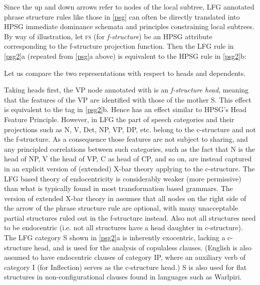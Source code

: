 \noindent
Since the up and down arrows refer to nodes of the local subtree, LFG annotated phrase structure rules like those in \ref{psg} can often be directly translated into HPSG immediate dominance schemata and principles constraining local subtrees.  
By way of illustration, let \textsc{fs} (for \textit{f-structure}) be an HPSG attribute corresponding to the f-structure projection function.  Then the LFG rule in \ref{psg2}a (repeated from \ref{psg}a above) is equivalent to the  HPSG rule in \ref{psg2}b:

\eal 
 \label{psg2}
\ex
{
}
               
\ex 
{
\phraserule{S[\textsc{fs} \fbox{1}]}{\rulenode{DP[\textsc{fs} \fbox{2}]}  \rulenode{VP[\textsc{fs}  \fbox{1}[\textsc{subj} \fbox{2}]}}}
\zl

\noindent
Let us compare the two representations with respect to heads and dependents.

Taking heads first, the VP node annotated with \updown is an \textit{f-structure head}, meaning that the features of the VP are identified with those of the mother S.  This effect is equivalent to the tag  in \ref{psg2}b.    Hence  \updown has an effect similar to HPSG's Head Feature Principle.  However, in LFG the part of speech categories and their projections such as N, V, Det, NP, VP, DP, etc. belong to the c-structure and not the f-structure.  As a consequence those features are not subject to sharing, and any principled correlations between such categories, such as the fact that N is the head of NP, V the head of VP, C as head of CP, and so on, are instead captured in an explicit version of (extended) X-bar theory applying to the c-structure.  The  LFG based theory of endocentricity is considerably weaker (more permissive) than what is typically found in most transformation based grammars.  The version of extended X-bar theory in \cite[chapter 6]{BATW2015a} assumes that all nodes on the right side of the arrow of the phrase structure rule are optional, with many unacceptable partial structures ruled out in the f-structure instead.  Also not all structures need to be endocentric (i.e. not all structures have a head daughter in c-structure).  The LFG category S shown in \ref{psg2}a is inherently exocentric, lacking a c-structure head, and is used for the analysis of copulaless clauses.   (English is also assumed to have endocentric clauses of category IP, where an auxiliary verb of category I (for Inflection) serves as the c-structure head.)  S is also used for flat structures in non-configurational clauses found in languages such as Warlpiri.   

